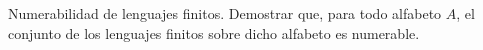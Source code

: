 \documentclass[12pt]{report} %
\begin{document}
\begin{ejercicio}
Numerabilidad de lenguajes finitos. Demostrar que, para todo alfabeto $A$, el conjunto de los lenguajes finitos sobre dicho alfabeto es numerable.
\end{ejercicio}


\end{document}
